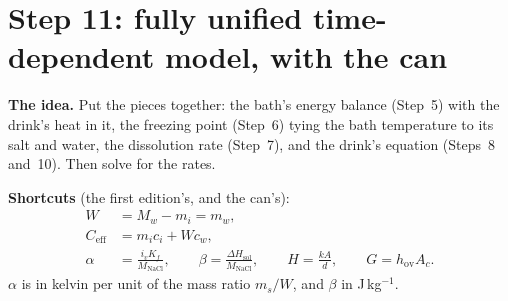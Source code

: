 \documentclass[11pt,a4paper]{article}
\newcommand{\Ceff}{C_{\mathrm{eff}}}
\newcommand{\Hsol}{\Delta H_{\mathrm{sol}}}
\newcommand{\MN}{M_{\mathrm{NaCl}}}
\newcommand{\hov}{h_{\mathrm{ov}}}
\newcommand{\para}[1]{\par\smallskip\noindent\textbf{#1}\enspace}
\begin{document}
\section{Step 11: fully unified time-dependent model, with the can}\label{sec:s11}

\para{The idea.} Put the pieces together: the bath's energy balance (Step~5) with the drink's heat in it,
the freezing point (Step~6) tying the bath temperature to its salt and water, the dissolution rate
(Step~7), and the drink's equation (Steps~8 and~10). Then solve for the rates.

\para{Shortcuts} (the first edition's, and the can's):
\begin{align}
W &= M_w - m_i = m_w, \label{eq:s11-W}\\
\Ceff &= m_ic_i + Wc_w, \label{eq:s11-Ceff}\\
\alpha &= \frac{i_vK_f}{\MN},\qquad \beta = \frac{\Hsol}{\MN},\qquad H = \frac{kA}{d},\qquad G = \hov A_c . \label{eq:s11-short}
\end{align}
$\alpha$ is in kelvin per unit of the mass ratio $m_s/W$, and $\beta$ in J\,kg$^{-1}$.
\end{document}
